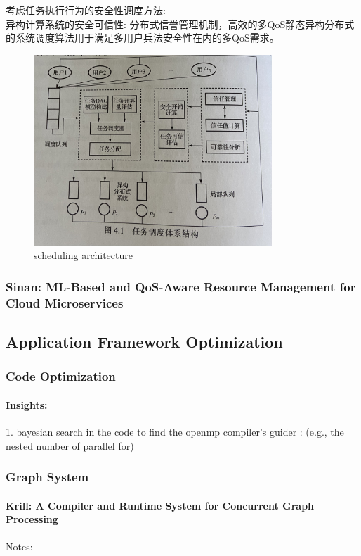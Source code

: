 \documentclass[UTF8]{article}
\begin{document}
考虑任务执行行为的安全性调度方法:\\异构计算系统的安全可信性: 分布式信誉管理机制，高效的多QoS静态异构分布式的系统调度算法用于满足多用户兵法安全性在内的多QoS需求。

\begin{figure}[htbp]
\caption{scheduling architecture}
\centering
\includegraphics[width=0.8\textwidth]{xiaoyongSchedule.jpg}
\end{figure}

\subsubsection{Sinan: ML-Based and QoS-Aware Resource Management for Cloud Microservices}


\subsection{Application Framework Optimization}
\subsubsection{Code Optimization}
\paragraph{Insights:}
1. bayesian search in the code to find the openmp compiler's guider : (e.g., the nested number of parallel for)
\subsubsection{Graph System}
\paragraph{Krill: A Compiler and Runtime System for Concurrent Graph Processing}
Notes:
\end{document}
